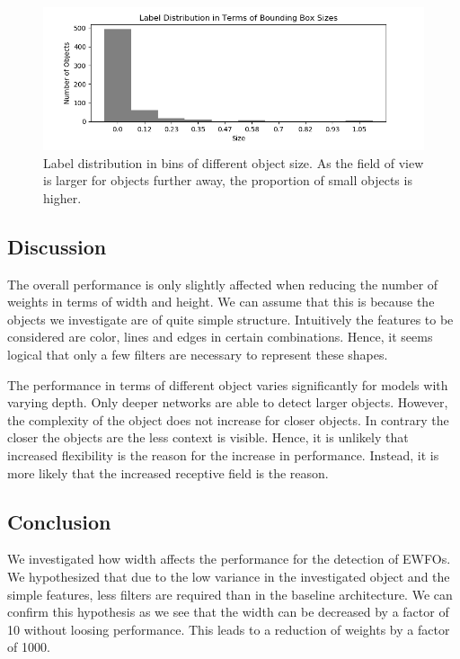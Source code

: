 	\begin{figure}
		\includegraphics[width=\textwidth]{fig/distr_size}
		\caption{Label distribution in bins of different object size. As the field of view is larger for objects further away, the proportion of small objects is higher.}
		\label{fig:size_bins}
	\end{figure}
	
	\subsection{Discussion}
	
	The overall performance is only slightly affected when reducing the number of weights in terms of width and height. We can assume that this is because the objects we investigate are of quite simple structure. Intuitively the features to be considered are color, lines and edges in certain combinations. Hence, it seems logical that only a few filters are necessary to represent these shapes.
	
	The performance in terms of different object varies significantly for models with varying depth. Only deeper networks are able to detect larger objects. However, the complexity of the object does not increase for closer objects. In contrary the closer the objects are the less context is visible. Hence, it is unlikely that increased flexibility is the reason for the increase in performance. Instead, it is more likely that the increased receptive field is the reason.
	
	\subsection{Conclusion}
	
	We investigated how width affects the performance for the detection of \acp{EWFO}. We hypothesized that due to the low variance in the investigated object and the simple features, less filters are required than in the baseline architecture. We can confirm this hypothesis as we see that the width can be decreased by a factor of 10 without loosing performance. This leads to a reduction of weights by a factor of 1000. 
	
